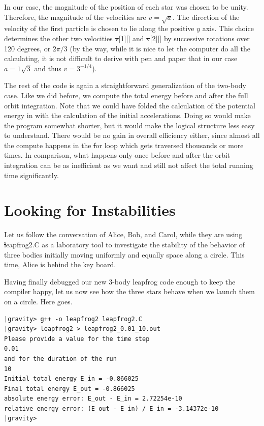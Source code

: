 In our case, the magnitude of the position of each star was chosen to
be unity.  Therefore, the magnitude of the velocities are $v = \sqrt{a}$.
The direction of the velocity of the first particle is chosen to lie
along the positive $y$ axis.  This choice determines the other two
velocities {\st v[1][]} and {\st v[2][]} by successive rotations over
120 degrees, or $2 \pi / 3$ (by the way, while it is nice to let the
computer do all the calculating, it is not difficult to derive with
pen and paper that in our case $a = 1\sqrt{3}$ and thus $v = 3^{-1/4}$).

The rest of the code is again a straightforward generalization of the
two-body case.  Like we did before, we compute the total energy before
and after the full orbit integration.  Note that we could have folded
the calculation of the potential energy in with the calculation of the
initial accelerations.  Doing so would make the program somewhat
shorter, but it would make the logical structure less easy to
understand.  There would be no gain in overall efficiency either,
since almost all the compute happens in the {\st for} loop which gets
traversed thousands or more times.  In comparison, what happens only
once before and after the orbit integration can be as inefficient as
we want and still not affect the total running time significantly.

\section{Looking for Instabilities}

Let us follow the conversation of Alice, Bob, and Carol, while they
are using {\st leapfrog2.C} as a laboratory tool to investigate the
stability of the behavior of three bodies initially moving uniformly
and equally space along a circle.  This time, Alice is behind the key
board.

\abc

\alice
Having finally debugged our new 3-body leapfrog code enough to keep
the compiler happy, let us now see how the three stars behave when we
launch them on a circle.  Here goes.

\cba

\begin{small}
\begin{verbatim}
|gravity> g++ -o leapfrog2 leapfrog2.C
|gravity> leapfrog2 > leapfrog2_0.01_10.out
Please provide a value for the time step
0.01
and for the duration of the run
10
Initial total energy E_in = -0.866025
Final total energy E_out = -0.866025
absolute energy error: E_out - E_in = 2.72254e-10
relative energy error: (E_out - E_in) / E_in = -3.14372e-10
|gravity>
\end{verbatim}
\end{small}


